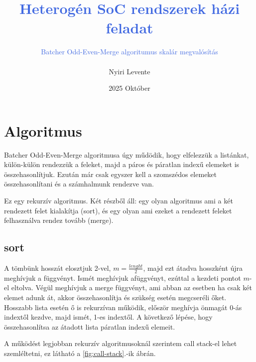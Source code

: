 \documentclass[12pt, letterpaper, a4paper]{article}
\title{\textcolor{RoyalBlue}{\textbf{Heterogén SoC rendszerek házi feladat}}}
\author{\textcolor{RoyalBlue}{Batcher Odd-Even-Merge algoritumus skalár megvalósítás} \\ \\ Nyiri Levente}
\date{2025 Október}
\begin{document}
\maketitle

\newpage

\section{Algoritmus}

Batcher Odd-Even-Merge algoritmusa úgy műdödik, hogy elfelezzük a listánkat, külön-külön rendezzük a feleket, majd a páros és páratlan indexű elemeket is összehasonlítjuk. Ezután már csak egyszer kell a szomszédos elemeket összehasonlítani és a számhalmunk rendezve van.

Ez egy rekurzív algoritmus. Két részből áll: egy olyan algoritmus ami a két rendezett felet kialakítja (sort), és egy olyan ami ezeket a rendezett feleket felhasználva rendez tovább (merge).

\subsection{sort}

A tömbünk hosszát elosztjuk 2-vel, \( m = \frac{lenght}{2} \), majd ezt átadva hosszként újra meghívjuk a függvényt. Ismét meghívjuk afüggvényt, ezúttal a kezdeti pontot \(m\)-el eltolva. Végül meghívjuk a merge függvényt, ami abban az esetben ha csak két elemet adunk át, akkor összehasonlítja és szükség esetén megcseréli őket. Hosszabb lista esetén ő is rekurzívan működik, először meghívja önmagát 0-ás indextől kezdve, majd ismét, 1-es indextől. A következő lépése, hogy összehasonlítsa az átadott lista páratlan indexű elemeit.

A működést legjobban rekurzív algoritmusoknál szerintem call stack-el lehet szemléltetni, ez látható a \ref{fig:call-stack}.-ik ábrán.

\newpage
\end{document}
